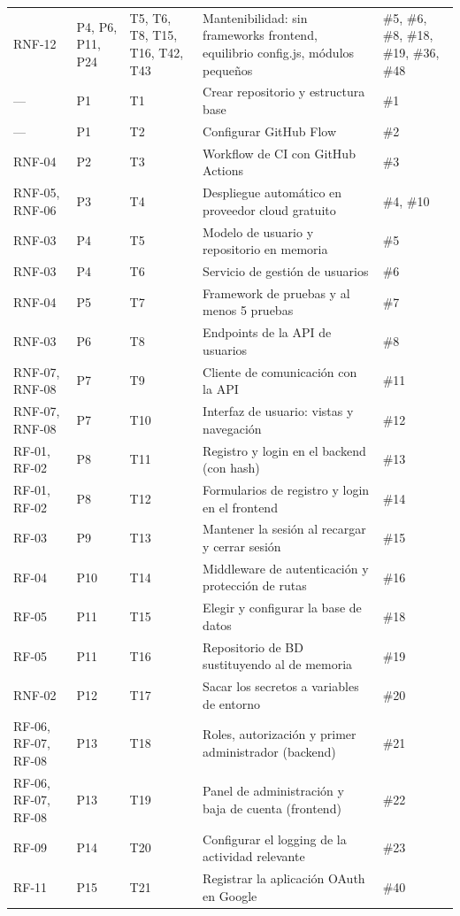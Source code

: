 {\begin{longtable}{@{}L{1.5cm} L{0.8cm} L{1.3cm} L{7.0cm} L{2.9cm}@{}}
RNF-12 & P4, P6, P11, P24 & T5, T6, T8, T15, T16, T42, T43 & Mantenibilidad: sin frameworks frontend, equilibrio config.js, módulos pequeños & \#5, \#6, \#8, \#18, \#19, \#36, \#48 \\
— & P1 & T1 & Crear repositorio y estructura base & \#1 \\
— & P1 & T2 & Configurar GitHub Flow & \#2 \\
RNF-04 & P2 & T3 & Workflow de CI con GitHub Actions & \#3 \\
RNF-05, RNF-06 & P3 & T4 & Despliegue automático en proveedor cloud gratuito & \#4, \#10 \\
RNF-03 & P4 & T5 & Modelo de usuario y repositorio en memoria & \#5 \\
RNF-03 & P4 & T6 & Servicio de gestión de usuarios & \#6 \\
RNF-04 & P5 & T7 & Framework de pruebas y al menos 5 pruebas & \#7 \\
RNF-03 & P6 & T8 & Endpoints de la API de usuarios & \#8 \\
RNF-07, RNF-08 & P7 & T9 & Cliente de comunicación con la API & \#11 \\
RNF-07, RNF-08 & P7 & T10 & Interfaz de usuario: vistas y navegación & \#12 \\
RF-01, RF-02 & P8 & T11 & Registro y login en el backend (con hash) & \#13 \\
RF-01, RF-02 & P8 & T12 & Formularios de registro y login en el frontend & \#14 \\
RF-03 & P9 & T13 & Mantener la sesión al recargar y cerrar sesión & \#15 \\
RF-04 & P10 & T14 & Middleware de autenticación y protección de rutas & \#16 \\
RF-05 & P11 & T15 & Elegir y configurar la base de datos & \#18 \\
RF-05 & P11 & T16 & Repositorio de BD sustituyendo al de memoria & \#19 \\
RNF-02 & P12 & T17 & Sacar los secretos a variables de entorno & \#20 \\
RF-06, RF-07, RF-08 & P13 & T18 & Roles, autorización y primer administrador (backend) & \#21 \\
RF-06, RF-07, RF-08 & P13 & T19 & Panel de administración y baja de cuenta (frontend) & \#22 \\
RF-09 & P14 & T20 & Configurar el logging de la actividad relevante & \#23 \\
RF-11 & P15 & T21 & Registrar la aplicación OAuth en Google & \#40 \\

\end{longtable}}
